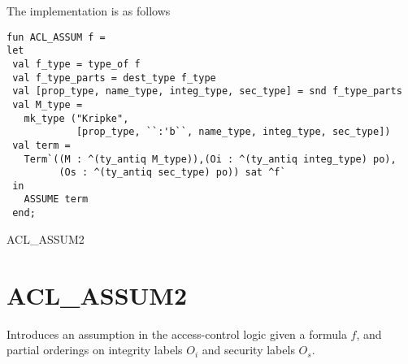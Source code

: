 \IMPLEMENTATION
The implementation is as follows
\begin{holboxed}
\begin{verbatim}
fun ACL_ASSUM f = 
let
 val f_type = type_of f
 val f_type_parts = dest_type f_type
 val [prop_type, name_type, integ_type, sec_type] = snd f_type_parts
 val M_type = 
   mk_type ("Kripke",
            [prop_type, ``:'b``, name_type, integ_type, sec_type])
 val term = 
   Term`((M : ^(ty_antiq M_type)),(Oi : ^(ty_antiq integ_type) po),
         (Os : ^(ty_antiq sec_type) po)) sat ^f`
 in
   ASSUME term
 end;
\end{verbatim}
\end{holboxed}

\SEEALSO
ACL\_ASSUM2
\ENDDOC

\section{ACL\_ASSUM2}




\egroup


\SYNOPSIS
Introduces an assumption in the access-control logic
given a formula $f$, and partial orderings on integrity
labels $O_i$ and security labels $O_s$.

